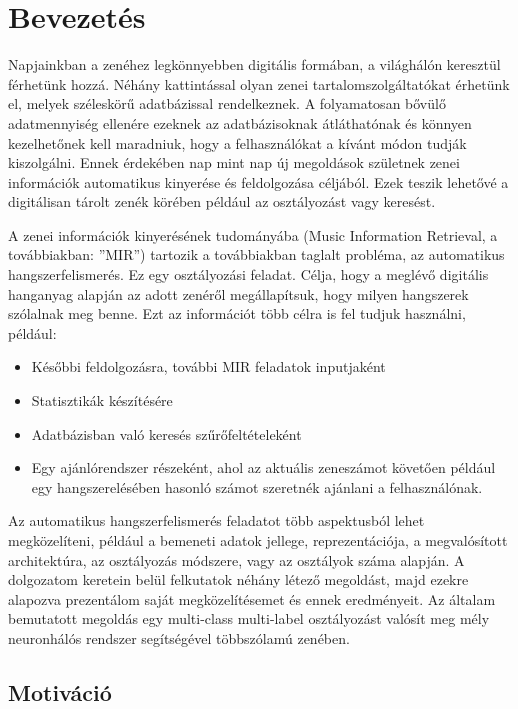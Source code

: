 \chapter{Bevezetés} %
\label{ch:intro}

Napjainkban a zenéhez legkönnyebben digitális formában, a világhálón keresztül férhetünk hozzá. Néhány kattintással olyan zenei tartalomszolgáltatókat érhetünk el, melyek széleskörű adatbázissal rendelkeznek. A folyamatosan bővülő adatmennyiség ellenére ezeknek az adatbázisoknak átláthatónak és könnyen kezelhetőnek kell maradniuk, hogy a felhasználókat a kívánt módon tudják kiszolgálni. Ennek érdekében nap mint nap új  megoldások születnek zenei információk automatikus kinyerése és feldolgozása céljából. Ezek teszik lehetővé a digitálisan tárolt zenék körében például az osztályozást vagy keresést.

A zenei információk kinyerésének tudományába (Music Information Retrieval, a továbbiakban: ''MIR'') tartozik a továbbiakban taglalt probléma, az automatikus hangszerfelismerés. Ez egy osztályozási feladat. Célja, hogy a meglévő digitális hanganyag alapján az adott zenéről megállapítsuk, hogy milyen hangszerek szólalnak meg benne. Ezt az információt több célra is fel tudjuk használni, például:
\begin{itemize}
 \item Későbbi feldolgozásra, további MIR feladatok inputjaként
 \item Statisztikák készítésére
 \item Adatbázisban való keresés szűrőfeltételeként
 \item Egy ajánlórendszer részeként, ahol az aktuális zeneszámot követően például egy hangszerelésében hasonló számot szeretnék ajánlani a felhasználónak.
\end{itemize}

Az automatikus hangszerfelismerés feladatot több aspektusból lehet megközelíteni, például a bemeneti adatok jellege, reprezentációja, a megvalósított architektúra, az osztályozás módszere, vagy az osztályok száma alapján. A dolgozatom keretein belül felkutatok néhány létező megoldást, majd ezekre alapozva prezentálom saját megközelítésemet és ennek eredményeit. Az általam bemutatott megoldás egy multi-class multi-label osztályozást valósít meg mély neuronhálós rendszer segítségével többszólamú zenében.

\section{Motiváció}

